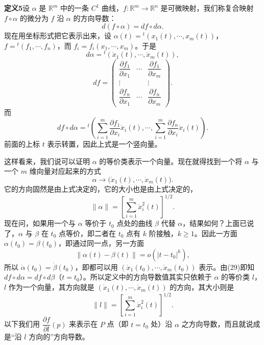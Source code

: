 \noindent\textbf{定义5}\quad 设 $\alpha$ 是 $\mathbb R^m$ 中的一条 $C^1$ 曲线，$f:\mathbb R^m\to\mathbb R^n$ 是可微映射，我们称复合映射 $f\circ\alpha$ 的微分为 $f$ 沿 $\alpha$ 的方向导数：
\begin{equation}
 d(f\circ\alpha)=df\circ d\alpha.
 \tag{28}
\end{equation}
现在用坐标形式把它表示出来，设 $\alpha(t)={}^t(x_1(t),\cdots,x_m(t))$，$f={}^t(f_1,\cdots,f_n)$，而 $f_i=f_i(x_1,\cdots,x_m)$。于是
\[
 d\alpha={}^t(\dot x_1(t),\cdots,\dot x_m(t)),
\]
\[
 df=
 \begin{pmatrix}
 \dfrac{\partial f_1}{\partial x_1}&\cdots&\dfrac{\partial f_1}{\partial x_m}\\
 \vdots&&\vdots\\
 \dfrac{\partial f_n}{\partial x_1}&\cdots&\dfrac{\partial f_n}{\partial x_m}
 \end{pmatrix}.
\]
而
\begin{equation}
 df\circ d\alpha
 ={}^t\!\left(
 \sum_{i=1}^m\frac{\partial f_1}{\partial x_i}\dot x_i(t),\cdots,
 \sum_{i=1}^m\frac{\partial f_n}{\partial x_i}\dot x_i(t)
 \right).
 \tag{29}
\end{equation}
前面的上标 $t$ 表示转置，因此上式是一个竖向量。

这样看来，我们说可以证明 $\alpha$ 的等价类表示一个向量。现在就得找到一个将 $\alpha$ 与一个 $m$ 维向量对应起来的方式
\[
 \alpha\longrightarrow\bigl(\dot x_1(t),\cdots,\dot x_m(t)\bigr).
\]
它的方向固然是由上式决定的，它的大小也是由上式决定的，
\[
 \lVert\alpha\rVert=\left[\sum_{i=1}^m\dot x_i^2(t)\right]^{1/2}.
\]
现在问，如果用一个与 $\alpha$ 等价于 $t_0$ 点处的曲线 $\beta$ 代替 $\alpha$，结果如何？上面已说了，$\alpha$ 与 $\beta$ 在 $t_0$ 点等价，即二者在 $t_0$ 点有 $k$ 阶接触，$k\ge1$。因此一方面 $\alpha(t_0)=\beta(t_0)$，即通过同一点，另一方面
\[
 \lVert\alpha(t)-\beta(t)\rVert=o(|t-t_0|^k),
\]
所以 $\dot\alpha(t_0)=\dot\beta(t_0)$，即都可以用 $(\dot x_1(t_0),\cdots,\dot x_m(t_0))$ 表示。由(29)即知 $df\circ d\alpha=df\circ d\beta$（$t=t_0$）。所以定义中的方向导数值其实只依赖于 $\alpha$ 的等价类 $l$，$l$ 作为一个向量，其方向就是 $(\dot x_1(t),\cdots,\dot x_m(t))$ 的方向，其大小则是
\[
 \lVert l\rVert=\left[\sum_{i=1}^m\dot x_i^2(t)\right]^{1/2}.
\]
以下我们用 $\dfrac{\partial f}{\partial l}(p)$ 来表示在 $P$ 点（即 $t=t_0$ 处）沿 $\alpha$ 之方向导数，而且就说成是“沿 $l$ 方向的”方向导数。

